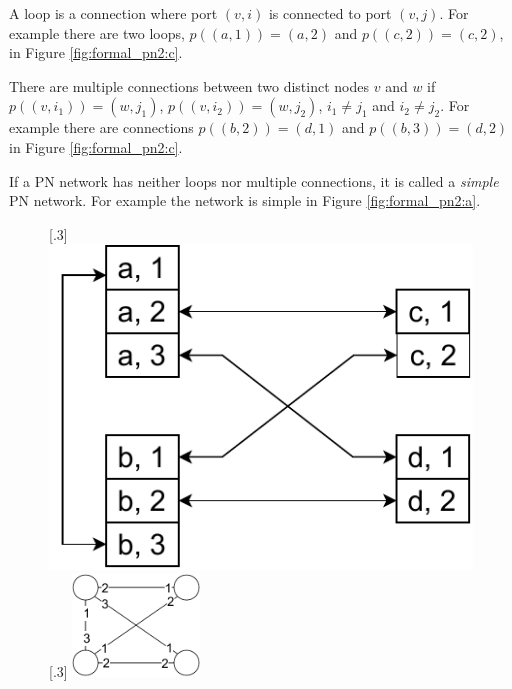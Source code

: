 A loop is a connection where port $(v, i)$ is connected to port $(v, j)$.
For example there are two loops, $p((a, 1)) = (a, 2)$ and $p((c,2)) = (c,2)$, in Figure \ref{fig:formal_pn2:c}.

There are multiple connections between two distinct nodes $v$ and $w$ if $p((v, i_1)) = (w, j_1)$, $p((v, i_2)) = (w, j_2)$, $i_1 \neq j_1$ and $i_2 \neq j_2$.
For example there are connections $p((b, 2)) = (d, 1)$ and $p((b, 3)) = (d, 2)$ in Figure \ref{fig:formal_pn2:c}.

If a PN network has neither loops nor multiple connections, it is called a \emph{simple} PN network.
For example the network is simple in Figure \ref{fig:formal_pn2:a}.


\begin{figure}[H]
    [.3\linewidth] {
    \centering
    \includegraphics[scale=0.55]{diagrams/formalizing_pn_network_diagram4.pdf}
  }
  \hfill
    [.3\linewidth] {
    \centering
    \includegraphics[width=0.3\textwidth]{diagrams/formalizing_pn_network_diagram5.pdf}
  }
  \hfill
\end{figure}
